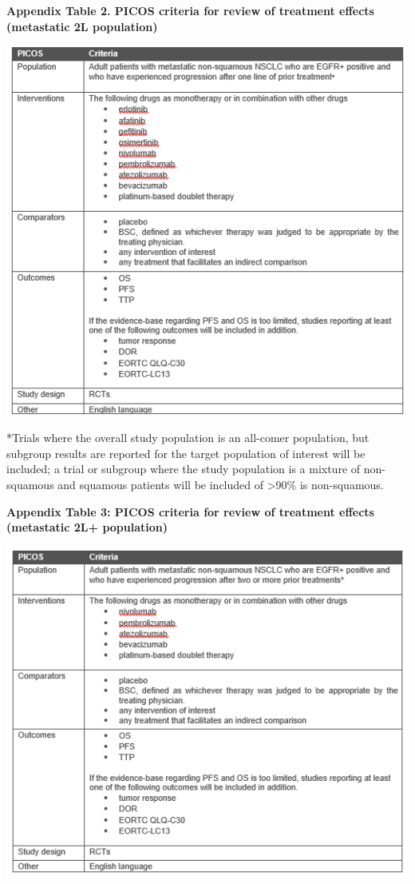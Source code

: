 \documentclass[11pt,final,fleqn]{article}\usepackage[]{graphicx}\usepackage[]{color}
\theoremstyle{plain}
\begin{document}
{\begin{appendices}
\textbf{Appendix Table 2. PICOS criteria for review of treatment effects (metastatic 2L population)}

\includegraphics[scale=1]{Appendix Table 2.PNG} 

*Trials where the overall study population is an all-comer population, but subgroup results are reported for the target population of interest will be included; a trial or subgroup where the study population is a mixture of non-squamous and squamous patients will be included of >90\% is non-squamous.

\textbf{Appendix Table 3: PICOS criteria for review of treatment effects (metastatic 2L+ population)}

\includegraphics[scale=1]{Appendix Table 3.PNG}


\end{appendices}}
\end{document}
